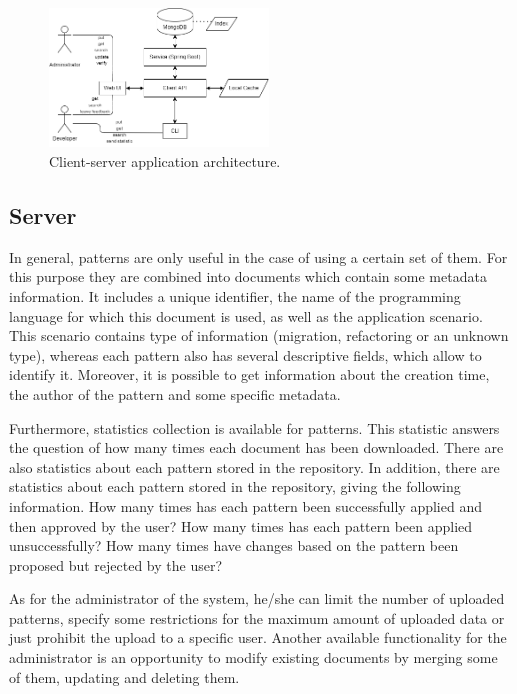 \documentclass[letterpaper, 10 pt, conference]{ieeeconf}  %
\begin{document}
\begin{figure}[hbtp]
    \centerline{\includegraphics[width=0.52\textwidth]{arch}}
    \caption{Client-server application architecture.}
    \label{fig:architecture}
\end{figure}

\subsection{Server}
In general, patterns are only useful in the case of using a certain set of them.
For this purpose they are combined into documents which contain some metadata
information.
It includes a unique identifier, the name of the programming language for which
this document is used, as well as the application scenario. 
This scenario contains type of information (migration, refactoring or an unknown
type), whereas each pattern also has several descriptive fields, which allow 
to identify it.
Moreover, it is possible to get information about the creation time, the author
of the pattern and some specific metadata.

Furthermore, statistics collection is available for patterns.
This statistic answers the question of how many times each document has been
downloaded.
There are also statistics about each pattern stored in the repository.
In addition, there are statistics about each pattern stored in the repository,
giving the following information.
How many times has each pattern been successfully applied and then approved by
the user?
How many times has each pattern been applied unsuccessfully? 
How many times have changes based on the pattern been proposed but rejected by
the user?

As for the administrator of the system, he/she can limit the number of uploaded
patterns, specify some restrictions for the maximum amount of uploaded data 
or just prohibit the upload to a specific user. 
Another available functionality for the administrator is an opportunity to
modify existing documents by merging some of them, updating and deleting them.
\end{document}
